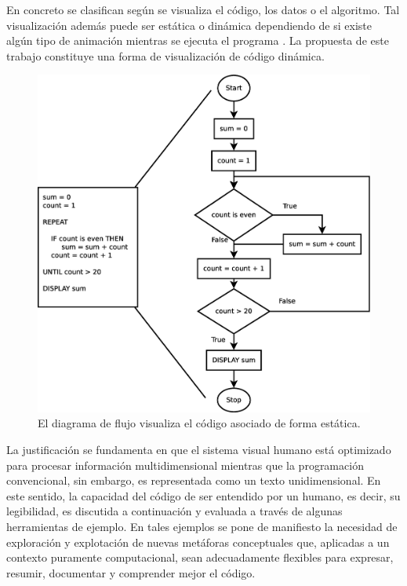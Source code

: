 \documentclass{llncs}
\begin{document}
En concreto se clasifican según se visualiza el código, los datos o el algoritmo. Tal visualización además puede ser estática o dinámica dependiendo de si existe algún tipo de animación mientras se ejecuta el programa \cite{urquiza2009survey}. La propuesta de este trabajo constituye una forma de visualización de código dinámica. 

\begin{figure}[ht]
\begin{center}
\includegraphics[scale=0.25]{images/flowchart.eps}
\caption{El diagrama de flujo visualiza el código asociado de forma estática.
\label{fig:flowchart}}
\end{center}
\end{figure}

La justificación se fundamenta en que el sistema visual humano está optimizado para procesar información multidimensional mientras que la programación convencional, sin embargo, es representada como un texto unidimensional. En este sentido, la capacidad del código de ser entendido por un humano, es decir, su legibilidad, es discutida a continuación y evaluada a través de algunas herramientas de ejemplo. En tales ejemplos se pone de manifiesto la necesidad de exploración y explotación de nuevas metáforas conceptuales que, aplicadas a un contexto puramente computacional, sean adecuadamente flexibles para expresar, resumir, documentar y comprender mejor el código. 
\end{document}

